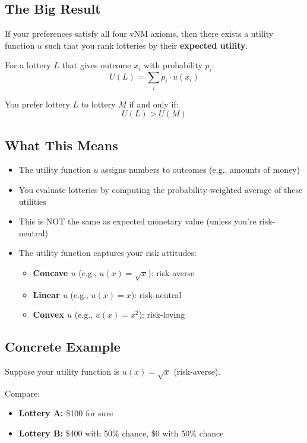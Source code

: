 \documentclass[12pt]{article}
\begin{document}
\subsection{The Big Result}

If your preferences satisfy all four vNM axioms, then there exists a utility function $u$ such that you rank lotteries by their \textbf{expected utility}.

For a lottery $L$ that gives outcome $x_i$ with probability $p_i$:
$$U(L) = \sum_{i} p_i \cdot u(x_i)$$

You prefer lottery $L$ to lottery $M$ if and only if:
$$U(L) > U(M)$$

\subsection{What This Means}

\begin{itemize}
\item The utility function $u$ assigns numbers to outcomes (e.g., amounts of money)
\item You evaluate lotteries by computing the probability-weighted average of these utilities
\item This is NOT the same as expected monetary value (unless you're risk-neutral)
\item The utility function captures your risk attitudes:
\begin{itemize}
\item \textbf{Concave $u$} (e.g., $u(x) = \sqrt{x}$): risk-averse
\item \textbf{Linear $u$} (e.g., $u(x) = x$): risk-neutral
\item \textbf{Convex $u$} (e.g., $u(x) = x^2$): risk-loving
\end{itemize}
\end{itemize}

\subsection{Concrete Example}

Suppose your utility function is $u(x) = \sqrt{x}$ (risk-averse).

Compare:
\begin{itemize}
\item \textbf{Lottery A:} \$100 for sure
\item \textbf{Lottery B:} \$400 with 50\% chance, \$0 with 50\% chance
\end{itemize}
\end{document}
